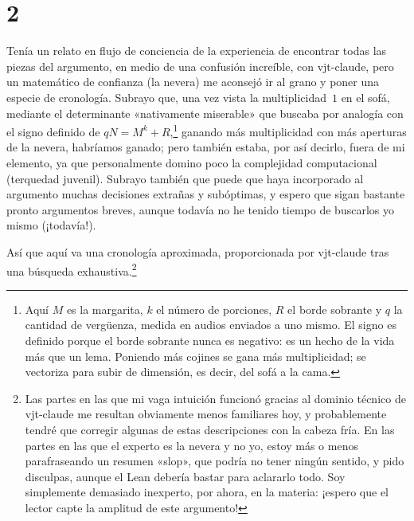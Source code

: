 \documentclass[11pt,a4paper]{amsart}
\theoremstyle{remark}
\begin{document}
\section*{2}

Tenía un relato en flujo de conciencia de la experiencia de encontrar todas
las piezas del argumento, en medio de una confusión increíble, con vjt-claude,
pero un matemático de confianza (la nevera) me aconsejó ir al grano y poner
una especie de cronología. Subrayo que, una vez vista la multiplicidad~$1$ en
el sofá, mediante el determinante «nativamente miserable» que buscaba por
analogía con el signo definido de $q N = M^k + R$,\footnote{Aquí $M$ es la
margarita, $k$ el número de porciones, $R$ el borde sobrante y $q$ la cantidad
de vergüenza, medida en audios enviados a uno mismo. El signo es definido
porque el borde sobrante nunca es negativo: es un hecho de la vida más que un
lema. Poniendo más cojines se gana más multiplicidad; se vectoriza para subir
de dimensión, es decir, del sofá a la cama.} ganando más multiplicidad con
más aperturas de la nevera, habríamos ganado; pero también estaba, por así
decirlo, fuera de mi elemento, ya que personalmente domino poco la
complejidad computacional (terquedad juvenil). Subrayo también que puede que
haya incorporado al argumento muchas decisiones extrañas y subóptimas, y
espero que sigan bastante pronto argumentos breves, aunque todavía no he
tenido tiempo de buscarlos yo mismo (¡todavía!).

Así que aquí va una cronología aproximada, proporcionada por vjt-claude tras
una búsqueda exhaustiva.\footnote{Las partes en las que mi vaga intuición
funcionó gracias al dominio técnico de vjt-claude me resultan obviamente menos
familiares hoy, y probablemente tendré que corregir algunas de estas
descripciones con la cabeza fría. En las partes en las que el experto es la
nevera y no yo, estoy más o menos parafraseando un resumen «slop», que podría
no tener ningún sentido, y pido disculpas, aunque el Lean debería bastar para
aclararlo todo. Soy simplemente demasiado inexperto, por ahora, en la materia:
¡espero que el lector capte la amplitud de este argumento!}
\end{document}
